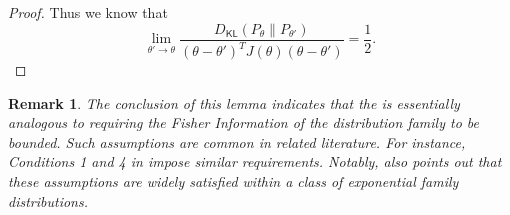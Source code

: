 \documentclass[11pt]{article}
\theoremstyle{plain}
\newtheorem{remark}[theorem]{Remark}
\theoremstyle{definition}
\newcommand{\DKL}{D_{\mathsf{KL}}}
\begin{document}
\begin{proof}
Thus we know that 
\[
\lim_{\theta' \to \theta} \frac{\DKL(P_\theta \| P_{\theta'})}{(\theta - \theta')^TJ(\theta)(\theta-\theta')}  = \frac{1}{2}.
\]

\end{proof}
\begin{remark}
\label{justify KL and MSE}
The conclusion of this lemma indicates that the   is essentially analogous to requiring the Fisher Information of the distribution family to be bounded. Such assumptions are common in related literature. For instance, Conditions 1 and 4 in \citep{clarke1990information} impose similar requirements. Notably, \citep{clarke1990information} also points out that these assumptions are widely satisfied within a class of exponential family distributions. 
\end{remark}
\end{document}

